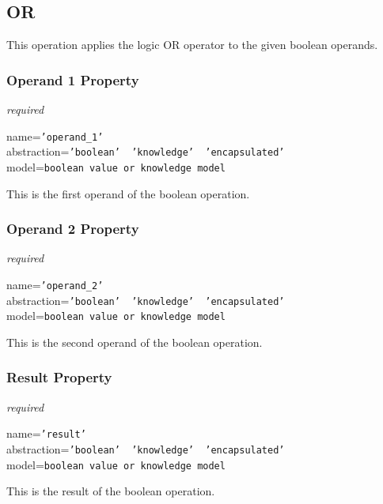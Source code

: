 %
%
%
%
%
%

\subsection{OR}
\label{or_heading}

This operation applies the logic OR operator to the given boolean operands.

\subsubsection{Operand 1 Property}

\emph{required}

name=\texttt{'operand\_1'}\\
abstraction=\texttt{'boolean' \vline\ 'knowledge' \vline\ 'encapsulated'}\\
model=\texttt{boolean value or knowledge model}

This is the first operand of the boolean operation.

\subsubsection{Operand 2 Property}

\emph{required}

name=\texttt{'operand\_2'}\\
abstraction=\texttt{'boolean' \vline\ 'knowledge' \vline\ 'encapsulated'}\\
model=\texttt{boolean value or knowledge model}

This is the second operand of the boolean operation.

\subsubsection{Result Property}

\emph{required}

name=\texttt{'result'}\\
abstraction=\texttt{'boolean' \vline\ 'knowledge' \vline\ 'encapsulated'}\\
model=\texttt{boolean value or knowledge model}

This is the result of the boolean operation.
